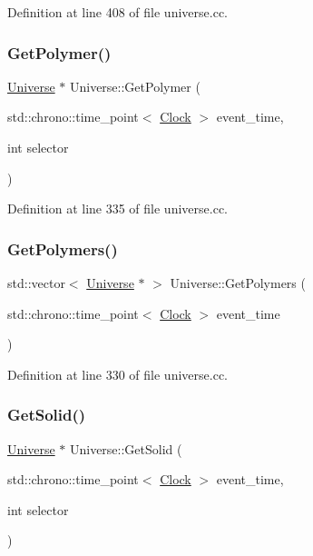 Definition at line 408 of file universe.\+cc.

\mbox{\label{class_universe_a2d5d3924a7d7ffd2a5f47be9f137d86e}} 
\subsubsection{\texorpdfstring{Get\+Polymer()}{GetPolymer()}}
{\footnotesize\ttfamily \mbox{\hyperlink{class_universe}{Universe}} $\ast$ Universe\+::\+Get\+Polymer (\begin{DoxyParamCaption}\item[{std\+::chrono\+::time\+\_\+point$<$ \mbox{\hyperlink{universe_8h_a0ef8d951d1ca5ab3cfaf7ab4c7a6fd80}{Clock}} $>$}]{event\+\_\+time,  }\item[{int}]{selector }\end{DoxyParamCaption})}



Definition at line 335 of file universe.\+cc.

\mbox{\label{class_universe_aac5d1c1a3a3ba56c8ca7115a85b2c239}} 
\subsubsection{\texorpdfstring{Get\+Polymers()}{GetPolymers()}}
{\footnotesize\ttfamily std\+::vector$<$ \mbox{\hyperlink{class_universe}{Universe}} $\ast$ $>$ Universe\+::\+Get\+Polymers (\begin{DoxyParamCaption}\item[{std\+::chrono\+::time\+\_\+point$<$ \mbox{\hyperlink{universe_8h_a0ef8d951d1ca5ab3cfaf7ab4c7a6fd80}{Clock}} $>$}]{event\+\_\+time }\end{DoxyParamCaption})}



Definition at line 330 of file universe.\+cc.

\mbox{\label{class_universe_a9f7b74fc21d45ddaa78aa18e9a337bcd}} 
\subsubsection{\texorpdfstring{Get\+Solid()}{GetSolid()}}
{\footnotesize\ttfamily \mbox{\hyperlink{class_universe}{Universe}} $\ast$ Universe\+::\+Get\+Solid (\begin{DoxyParamCaption}\item[{std\+::chrono\+::time\+\_\+point$<$ \mbox{\hyperlink{universe_8h_a0ef8d951d1ca5ab3cfaf7ab4c7a6fd80}{Clock}} $>$}]{event\+\_\+time,  }\item[{int}]{selector }\end{DoxyParamCaption})}



